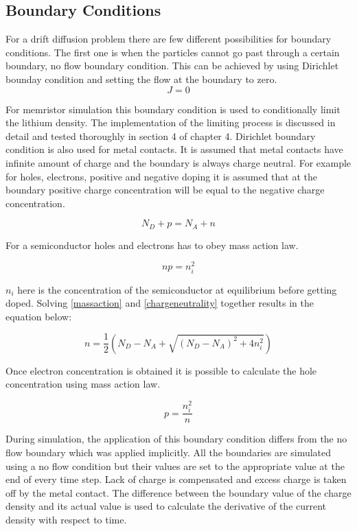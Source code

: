 \begin{doublespace}
\subsection{Boundary Conditions}

For a drift diffusion problem there are few different possibilities for boundary conditions. The first one is when the particles cannot go past through a certain boundary, no flow boundary condition. This can be achieved by using Dirichlet bounday condition and setting the flow at the boundary to zero. 
\begin{equation}
J=0
\end{equation}

For memristor simulation this boundary condition is used to conditionally limit the lithium density. The implementation of the limiting process is discussed in detail and tested thoroughly in section 4 of chapter 4. Dirichlet boundary condition is also used for metal contacts. It is assumed that metal contacts have infinite amount of charge and the boundary is always charge neutral. For example for holes, electrons, positive and negative doping it is assumed that at the boundary positive charge concentration will be equal to the negative charge concentration. 

\begin{equation}
N_{D} + p=N_{A} + n
\label{chargeneutrality}
\end{equation}

For a semiconductor holes and electrons has to obey mass action law.

\begin{equation}
np=n_i^2
\label{massaction}
\end{equation}

$n_i$ here is the concentration of the semiconductor at equilibrium before getting doped. Solving \eqref{massaction} and \eqref{chargeneutrality} together results in the equation below:

\begin{equation}
n=\frac{1}{2}(N_D - N_A + \sqrt{(N_D - N_A)^2+4n_i^2})
\label{nbound}
\end{equation}

Once electron concentration is obtained it is possible to calculate the hole concentration using mass action law.

\begin{equation}
p=\frac{n_i^2}{n}
\label{pbound}
\end{equation}


During simulation, the application of this boundary condition differs from the no flow boundary which was applied implicitly. All the boundaries are simulated using a no flow condition but their values are set to the appropriate value at the end of every time step. Lack of charge is compensated and excess charge is taken off by the metal contact. The difference between the boundary value of the charge density and its actual value is used to calculate the derivative of the current density with respect to time.


\end{doublespace}
